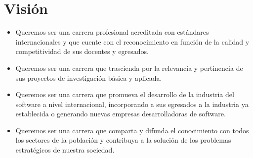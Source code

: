 \section{Visión}\label{sec:cs-vision}
\begin{itemize}
\item Queremos ser una carrera profesional acreditada con estándares internacionales y que
cuente con el reconocimiento en función de la calidad y competitividad de sus docentes 
y egresados.

\item Queremos ser una carrera que trascienda por la relevancia y pertinencia
de sus proyectos de investigación básica y aplicada.

\item Queremos ser una carrera que promueva el desarrollo de la industria del
software a nivel internacional, incorporando a sus egresados a la industria 
ya establecida o generando nuevas empresas desarrolladoras de software.

\item Queremos ser una carrera que comparta y difunda el conocimiento con
todos los sectores de la población y contribuya a la solución de los problemas 
estratégicos de nuestra sociedad.
\end{itemize}
